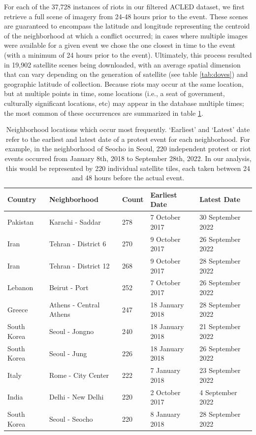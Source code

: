 For each of the 37,728 instances of riots in our filtered ACLED dataset, we first retrieve a full scene of imagery from 24-48 hours prior to the event.  These scenes are guaranteed to encompass the latitude and longitude representing the centroid of the neighborhood at which a conflict occurred; in cases where multiple images were available for a given event we chose the one closest in time to the event (with a minimum of 24 hours prior to the event).  Ultimately, this process resulted in 19,902 satellite scenes being downloaded, with an average spatial dimension that can vary depending on the generation of satellite (see table \ref{tab:doves}) and geographic latitude of collection. Because riots may occur at the same location, but at multiple points in time, some locations (i.e., a seat of government, culturally significant locations, etc) may appear in the database multiple times; the most common of these occurrences are summarized in table \ref{tab:occurrence}.


\begin{table}[htbp]
    \centering
    
    \begin{tabular}{|l|l|l|l|l|}
        \hline
        \textbf{Country} & \textbf{Neighborhood} & \textbf{Count} & \textbf{Earliest Date} & \textbf{Latest Date} \\
        \hline
        Pakistan & Karachi - Saddar &  278 & 7 October 2017 & 30 September 2022 \\
        Iran & Tehran - District 6 &  270 & 9 October 2017 & 26 September 2022 \\
        Iran & Tehran - District 12 & 268 & 9 October 2017 & 28 September 2022 \\
        Lebanon & Beirut - Port & 252 & 7 October 2017 & 26 September 2022 \\
        Greece & Athens - Central Athens & 247 & 18 January 2018 & 28 September 2022 \\
        South Korea & Seoul - Jongno &  240 & 18 January 2018 & 21 September 2022 \\
        South Korea & Seoul - Jung & 226 & 18 January 2018 & 26 September 2022 \\
        Italy & Rome - City Center &  222 & 7 January 2018 & 23 September 2022 \\
        India & Delhi - New Delhi &  220 & 2 October 2017 & 4 September 2022\\
        South Korea & Seoul - Seocho & 220 & 8 January 2018 & 28 September 2022 \\
        \hline
    \end{tabular}
    \caption{Neighborhood locations which occur most frequently.  `Earliest' and `Latest' date refer to the earliest and latest date of a protest event for each neighborhood.  For example, in the neighborhood of Seocho in Seoul, 220 independent protest or riot events occurred from January 8th, 2018 to September 28th, 2022.  In our analysis, this would be represented by 220 individual satellite tiles, each taken between 24 and 48 hours before the actual event.}
    \label{tab:occurrence}
\end{table}



